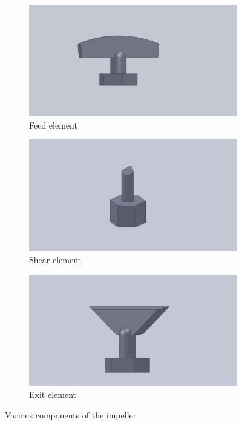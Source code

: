 \documentclass[preprint,11pt,authoryear]{elsarticle}
\begin{document}
	      \begin{figure}[H]
			
	      \begin{subfigure}{.3\textwidth}
  			\centering
  			\includegraphics[scale=0.075]{feed_element.pdf}	      
  			\caption{Feed element}
  			\label{fig:mthds_dem_feed_element}
			\end{subfigure}%
			\begin{subfigure}{.3\textwidth}
  			\centering
			\includegraphics[scale=0.075]{shear_element.pdf}
  			\caption{Shear element}
  			\label{fig:mthds_dem_shear_element}
			\end{subfigure}
	      	\begin{subfigure}{.3\textwidth}
  			\centering
	      \includegraphics[scale=0.075]{exit_element.pdf}
  			\caption{Exit element}
  			\label{fig:mthds_dem_exit_element}
			\end{subfigure}
	      


	      \caption{ Various components of the impeller}
	      \label{fig:mthds_dem_charles_fig5pt3and4_blades_n_isometric}
	      \end{figure}     
	    
\end{document}
